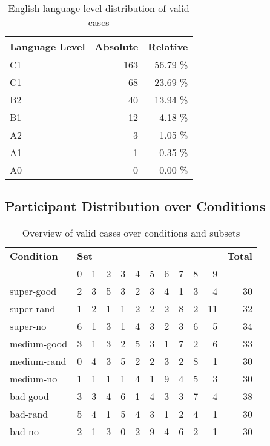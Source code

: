 \begin{table}[H]
	\centering
	\begin{tabular}{l|rr}
		\textbf{Language Level} & \textbf{Absolute} & \textbf{Relative} \\ \midrule
		C1 			& 163 & 56.79 \%\\
		C1		 	& 68 & 23.69 \%\\
		B2	 		& 40 & 13.94 \%\\ 
		B1 			& 12 & 4.18 \%\\ 
		A2 			& 3 & 1.05 \%\\ 
		A1	 		& 1 & 0.35 \%\\ 
		A0 			& 0 & 0.00 \%\\ \bottomrule
	\end{tabular}
	\caption{English language level distribution of valid cases}
\end{table}




\subsection{Participant Distribution over Conditions}
\begin{table}[H]
	\centering
	\begin{tabular}{l|rrrrrrrrrr|r}
		\textbf{Condition} & \multicolumn{10}{l|}{\textbf{Set}} & \textbf{Total} \\
		  & 0 & 1 & 2 & 3 & 4 & 5 & 6 & 7 & 8 & 9 & \\ \midrule
		super-good & 	2 &  3 &  5 &  3 &  2 &  3 &  4 &  1 &  3 &  4 &  	 30 \\
		super-rand & 	1 &  2 &  1 &  1 &  2 &  2 &  2 &  8 &  2 &  11 &  	 32 \\
		super-no & 	6 &  1 &  3 &  1 &  4 &  3 &  2 &  3 &  6 &  5 &  	 34 \\
		medium-good & 	3 &  1 &  3 &  2 &  5 &  3 &  1 &  7 &  2 &  6 &  	 33 \\
		medium-rand & 	0 &  4 &  3 &  5 &  2 &  2 &  3 &  2 &  8 &  1 &  	 30 \\
		medium-no & 	1 &  1 &  1 &  1 &  4 &  1 &  9 &  4 &  5 &  3 &  	 30 \\
		bad-good & 	3 &  3 &  4 &  6 &  1 &  4 &  3 &  3 &  7 &  4 &  	 38 \\
		bad-rand & 	5 &  4 &  1 &  5 &  4 &  3 &  1 &  2 &  4 &  1 &  	 30 \\
		bad-no & 	2 &  1 &  3 &  0 &  2 &  9 &  4 &  6 &  2 &  1 &  	 30 \\ \bottomrule
	\end{tabular}
	\caption{Overview of valid cases over conditions and subsets}
\end{table}





